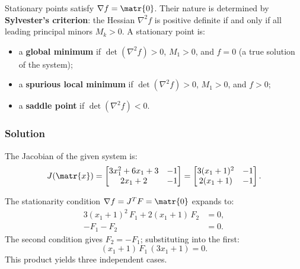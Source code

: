 Stationary points satisfy $\nabla f = \matr{0}$.
Their nature is determined by \textbf{Sylvester's criterion}: the Hessian
$\nabla^2 f$ is positive definite if and only if all leading principal minors
$M_k > 0$.
A stationary point is:
\begin{itemize}
  \item a \textbf{global minimum} if $\det(\nabla^2 f) > 0$, $M_1 > 0$, and $f = 0$
        (a true solution of the system);
  \item a \textbf{spurious local minimum} if $\det(\nabla^2 f) > 0$, $M_1 > 0$,
        and $f > 0$;
  \item a \textbf{saddle point} if $\det(\nabla^2 f) < 0$.
\end{itemize}

\subsubsection*{Solution}

The Jacobian of the given system is:
\begin{equation*}
  J(\matr{x}) =
  \begin{bmatrix}
    3x_1^2 + 6x_1 + 3 & -1 \\
    2x_1 + 2           & -1
  \end{bmatrix}
  =
  \begin{bmatrix}
    3(x_1+1)^2 & -1 \\
    2(x_1+1)   & -1
  \end{bmatrix}.
\end{equation*}

The stationarity condition $\nabla f = J^T F = \matr{0}$ expands to:
\begin{align*}
  3(x_1+1)^2\,F_1 + 2(x_1+1)\,F_2 &= 0, \\
  -F_1 - F_2 &= 0.
\end{align*}
The second condition gives $F_2 = -F_1$; substituting into the first:
\begin{equation*}
  (x_1+1)\,F_1\,(3x_1+1) = 0.
\end{equation*}
This product yields three independent cases.

